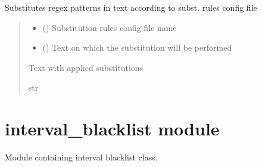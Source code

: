 \documentclass[letterpaper,10pt,english]{sphinxmanual}
\begin{document}

\begin{fulllineitems}
\label{\detokenize{general_utils:general_utils.substitute_patterns}}
\pysigstartsignatures
\pysiglinewithargsret
{}
{\sphinxparamcomma {}}
{}
\pysigstopsignatures
\sphinxAtStartPar
Substitutes regex patterns in text according to subst. rules config file
\begin{quote}\begin{description}
\begin{itemize}
\item {} 
\sphinxAtStartPar
{} () \textendash{} Substitution rules config file name

\item {} 
\sphinxAtStartPar
{} () \textendash{} Text on which the substitution will be performed

\end{itemize}

\sphinxAtStartPar
Text with applied substitutions

\sphinxAtStartPar
str

\end{description}\end{quote}

\end{fulllineitems}


\sphinxstepscope


\section{interval\_blacklist module}
\label{\detokenize{interval_blacklist:module-interval_blacklist}}\label{\detokenize{interval_blacklist:interval-blacklist-module}}\label{\detokenize{interval_blacklist::doc}}
\sphinxAtStartPar
Module containing interval blacklist class.
\end{document}
